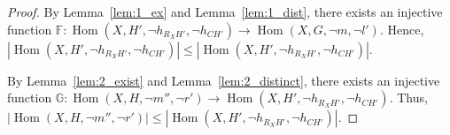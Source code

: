 \begin{proof}
    By Lemma~\ref{lem:1_ex} and Lemma~\ref{lem:1_dist}, there exists an injective function $\mathbb{F} : \operatorname{Hom}(X, H', \lnot h_{R_XH'}, \lnot h_{CH'}) \mathop{\to} \operatorname{Hom}(X, G, \lnot m, \lnot l')$. Hence, $|\operatorname{Hom}(X, H', \lnot h_{R_XH'}, \lnot h_{CH'})| \leq |\operatorname{Hom}(X, H', \lnot h_{R_XH'}, \lnot h_{CH'})|$.
   
    By Lemma~\ref{lem:2_exist} and Lemma~\ref{lem:2_distinct}, there exists an injective function $\mathbb{G} : \operatorname{Hom}(X, H, \lnot m'', \lnot r') \mathop{\to} \operatorname{Hom}(X, H', \lnot h_{R_XH'}, \lnot h_{CH'})$. Thus, $|\operatorname{Hom}(X, H, \lnot m'', \lnot r')| \leq |\operatorname{Hom}(X, H', \lnot h_{R_XH'}, \lnot h_{CH'})|$.

\end{proof}  








          

